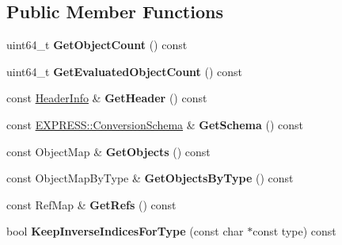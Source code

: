 \subsection*{Public Member Functions}
\begin{DoxyCompactItemize}
\item 
\hypertarget{class_assimp_1_1_s_t_e_p_1_1_d_b_ad7f54df3d75e2f495bd2ba761bb752b8}{uint64\+\_\+t {\bfseries Get\+Object\+Count} () const }\label{class_assimp_1_1_s_t_e_p_1_1_d_b_ad7f54df3d75e2f495bd2ba761bb752b8}

\item 
\hypertarget{class_assimp_1_1_s_t_e_p_1_1_d_b_aaf97d1d275225898b4ef3635dac2d57c}{uint64\+\_\+t {\bfseries Get\+Evaluated\+Object\+Count} () const }\label{class_assimp_1_1_s_t_e_p_1_1_d_b_aaf97d1d275225898b4ef3635dac2d57c}

\item 
\hypertarget{class_assimp_1_1_s_t_e_p_1_1_d_b_a2216031a1ac9b43f258d2609a1adcd7c}{const \hyperlink{struct_assimp_1_1_s_t_e_p_1_1_header_info}{Header\+Info} \& {\bfseries Get\+Header} () const }\label{class_assimp_1_1_s_t_e_p_1_1_d_b_a2216031a1ac9b43f258d2609a1adcd7c}

\item 
\hypertarget{class_assimp_1_1_s_t_e_p_1_1_d_b_aa315308e8209af92473eeda9ea115e87}{const \hyperlink{class_assimp_1_1_s_t_e_p_1_1_e_x_p_r_e_s_s_1_1_conversion_schema}{E\+X\+P\+R\+E\+S\+S\+::\+Conversion\+Schema} \& {\bfseries Get\+Schema} () const }\label{class_assimp_1_1_s_t_e_p_1_1_d_b_aa315308e8209af92473eeda9ea115e87}

\item 
\hypertarget{class_assimp_1_1_s_t_e_p_1_1_d_b_aa47a19dcdd356e5b38ee96811ab13de3}{const Object\+Map \& {\bfseries Get\+Objects} () const }\label{class_assimp_1_1_s_t_e_p_1_1_d_b_aa47a19dcdd356e5b38ee96811ab13de3}

\item 
\hypertarget{class_assimp_1_1_s_t_e_p_1_1_d_b_af24fc7a0927811cefb817a30e0d8e34b}{const Object\+Map\+By\+Type \& {\bfseries Get\+Objects\+By\+Type} () const }\label{class_assimp_1_1_s_t_e_p_1_1_d_b_af24fc7a0927811cefb817a30e0d8e34b}

\item 
\hypertarget{class_assimp_1_1_s_t_e_p_1_1_d_b_afd2b4ba57fbc079809cfd28af42fb34b}{const Ref\+Map \& {\bfseries Get\+Refs} () const }\label{class_assimp_1_1_s_t_e_p_1_1_d_b_afd2b4ba57fbc079809cfd28af42fb34b}

\item 
\hypertarget{class_assimp_1_1_s_t_e_p_1_1_d_b_a46500ad3f6f543df5a6d86c7353e74cb}{bool {\bfseries Keep\+Inverse\+Indices\+For\+Type} (const char $\ast$const type) const }\label{class_assimp_1_1_s_t_e_p_1_1_d_b_a46500ad3f6f543df5a6d86c7353e74cb}


\end{DoxyCompactItemize}
